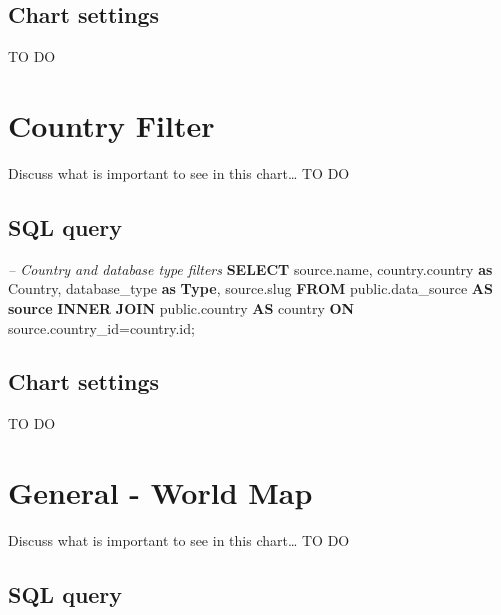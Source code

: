 \documentclass[]{book}
\newenvironment{Shaded}{\begin{snugshade}}{\end{snugshade}}
\newcommand{\KeywordTok}[1]{\textcolor[rgb]{0.13,0.29,0.53}{\textbf{#1}}}
\newcommand{\CommentTok}[1]{\textcolor[rgb]{0.56,0.35,0.01}{\textit{#1}}}
\newcommand{\NormalTok}[1]{#1}
\begin{document}
\subsection{Chart settings}\label{chart-settings}

TO DO

\section{Country Filter}\label{country-filter}

Discuss what is important to see in this chart\ldots{} TO DO

\subsection{SQL query}\label{sql-query-1}

\begin{Shaded}
\begin{Highlighting}[]
\CommentTok{--  Country and database type filters}
\KeywordTok{SELECT}\NormalTok{ source.name, }
\NormalTok{       country.country }\KeywordTok{as}\NormalTok{ Country, }
\NormalTok{       database_type }\KeywordTok{as} \KeywordTok{Type}\NormalTok{,}
\NormalTok{       source.slug}
\KeywordTok{FROM}\NormalTok{ public.data_source }\KeywordTok{AS} \KeywordTok{source} \KeywordTok{INNER} \KeywordTok{JOIN}\NormalTok{ public.country }
  \KeywordTok{AS}\NormalTok{ country }\KeywordTok{ON}\NormalTok{ source.country_id=country.id;}
\end{Highlighting}
\end{Shaded}

\subsection{Chart settings}\label{chart-settings-1}

TO DO

\section{General - World Map}\label{general---world-map}

Discuss what is important to see in this chart\ldots{} TO DO

\subsection{SQL query}\label{sql-query-2}
\end{document}
